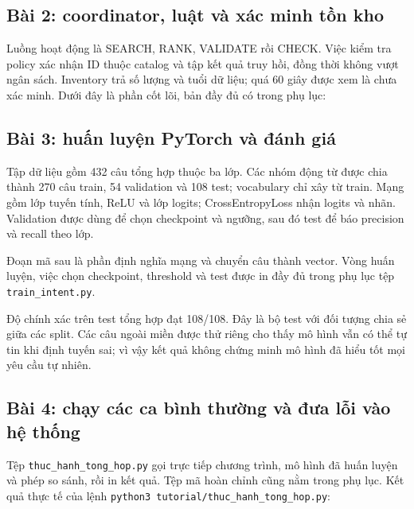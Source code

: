 \subsection{Bài 2: coordinator, luật và xác minh tồn kho}
Luồng hoạt động là SEARCH, RANK, VALIDATE rồi CHECK. Việc kiểm tra policy xác nhận ID thuộc catalog và tập kết quả truy hồi, đồng thời không vượt ngân sách. Inventory trả số lượng và tuổi dữ liệu; quá 60 giây được xem là chưa xác minh. Dưới đây là phần cốt lõi, bản đầy đủ có trong phụ lục:


\subsection{Bài 3: huấn luyện PyTorch và đánh giá}
Tập dữ liệu gồm 432 câu tổng hợp thuộc ba lớp. Các nhóm động từ được chia thành 270 câu train, 54 validation và 108 test; vocabulary chỉ xây từ train. Mạng gồm lớp tuyến tính, ReLU và lớp logits; CrossEntropyLoss nhận logits và nhãn. Validation được dùng để chọn checkpoint và ngưỡng, sau đó test để báo precision và recall theo lớp.

Đoạn mã sau là phần định nghĩa mạng và chuyển câu thành vector. Vòng huấn luyện, việc chọn checkpoint, threshold và test được in đầy đủ trong phụ lục tệp \texttt{train\_intent.py}.


Độ chính xác trên test tổng hợp đạt 108/108. Đây là bộ test với đối tượng chia sẻ giữa các split. Các câu ngoài miền được thử riêng cho thấy mô hình vẫn có thể tự tin khi định tuyến sai; vì vậy kết quả không chứng minh mô hình đã hiểu tốt mọi yêu cầu tự nhiên.

\subsection{Bài 4: chạy các ca bình thường và đưa lỗi vào hệ thống}
Tệp \texttt{thuc\_hanh\_tong\_hop.py} gọi trực tiếp chương trình, mô hình đã huấn luyện và phép so sánh, rồi in kết quả. Tệp mã hoàn chỉnh cũng nằm trong phụ lục. Kết quả thực tế của lệnh \texttt{python3 tutorial/thuc\_hanh\_tong\_hop.py}:


